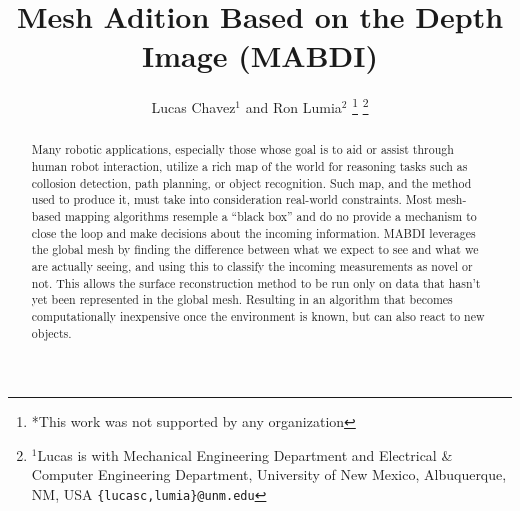 \documentclass[letterpaper, 10 pt, conference]{ieeeconf}  %
\title{\LARGE \bf
Mesh Adition Based on the Depth Image (MABDI)
}
\author{Lucas Chavez$^{1}$ and Ron Lumia$^{2}$%
\thanks{*This work was not supported by any organization}%
\thanks{$^{1}$Lucas is with Mechanical Engineering Department and Electrical \& Computer Engineering Department, University of New Mexico,
	Albuquerque, NM, USA
        {\tt\small \{lucasc,lumia\}@unm.edu}}%
}
\begin{document}
\maketitle
\thispagestyle{empty}
\pagestyle{empty}


\begin{abstract}


Many robotic applications, especially those whose goal is to aid or assist
through human robot interaction, utilize a rich map of the world for reasoning
tasks such as collosion detection, path planning, or object recognition. Such
map, and the method used to produce it, must take into consideration real-world
constraints. Most mesh-based mapping algorithms resemple a ``black box'' and do
no provide a mechanism to close the loop and make decisions about the
incoming information. MABDI leverages the global mesh by finding the difference
between what we expect to see and what we are actually seeing, and using this to
classify the incoming measurements as novel or not. This allows the surface
reconstruction method to be run only on data that hasn't yet been represented in
the global mesh. Resulting in an algorithm that becomes computationally
inexpensive once the environment is known, but can also react to new objects.


\end{abstract}









% 

% 




\end{document}
